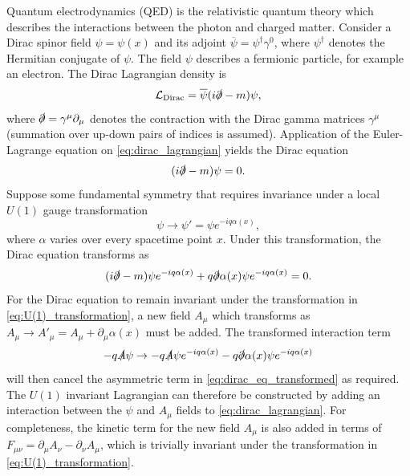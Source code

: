 Quantum electrodynamics (QED) is the relativistic quantum theory which describes the interactions between the photon and charged matter.
Consider a Dirac spinor field $\psi = \psi(x)$ and its adjoint $\overline{\psi} = \psi^\dagger \gamma^0$, where $\psi^\dagger$ denotes the Hermitian conjugate of $\psi$.
The field $\psi$ describes a fermionic \spinhalf particle, for example an electron.
The Dirac Lagrangian density is
%
\begin{equation}\label{eq:dirac_lagrangian}
  \mathcal{L}_{\textnormal{Dirac}} = \overline{\psi} (i \slashed{\partial}  - m )\psi,
\end{equation}
%
where $\slashed{\partial} = \gamma^\mu \partial_\mu$ denotes the contraction with the Dirac gamma matrices $\gamma^\mu$ (summation over up-down pairs of indices is assumed).
Application of the Euler-Lagrange equation on \cref{eq:dirac_lagrangian} yields the Dirac equation
%
\begin{equation}\label{eq:dirac_eq}
  (i \slashed{\partial}  - m )\psi = 0 .
\end{equation}
%
Suppose some fundamental symmetry that requires invariance under a local $U(1)$ gauge transformation
%
\begin{equation}\label{eq:U(1)_transformation}
  \psi \rightarrow \psi' = \psi e^{- i q \alpha(x)} ,
\end{equation}
%
where $\alpha$ varies over every spacetime point $x$.
Under this transformation, the Dirac equation transforms as 
%
\begin{equation}\label{eq:dirac_eq_transformed}
  (i \slashed{\partial} - m ) \psi e^{- i q \alpha(x)} + q \slashed{\partial}\alpha(x) \psi e^{- i q \alpha(x)} = 0.
\end{equation}
%
For the Dirac equation to remain invariant under the transformation in \cref{eq:U(1)_transformation}, a new field $A_\mu$ which transforms as $A_\mu \rightarrow A'_\mu = A_\mu + \partial_\mu \alpha(x)$ must be added.
The transformed interaction term
%
\begin{equation}
  - q \slashed{A} \psi \rightarrow - q \slashed{A} \psi e^{- i q \alpha(x)} - q \slashed{\partial} \alpha(x) \psi e^{- i q \alpha(x)}
\end{equation}
%
will then cancel the asymmetric term in \cref{eq:dirac_eq_transformed} as required.
The $U(1)$ invariant Lagrangian can therefore be constructed by adding an interaction between the $\psi$ and $A_\mu$ fields to \cref{eq:dirac_lagrangian}. For completeness, the kinetic term for the new field $A_\mu$ is also added in terms of $F_{\mu\nu} = \partial_\mu A_\nu - \partial_\nu A_\mu$, which is trivially invariant under the transformation in \cref{eq:U(1)_transformation}.
